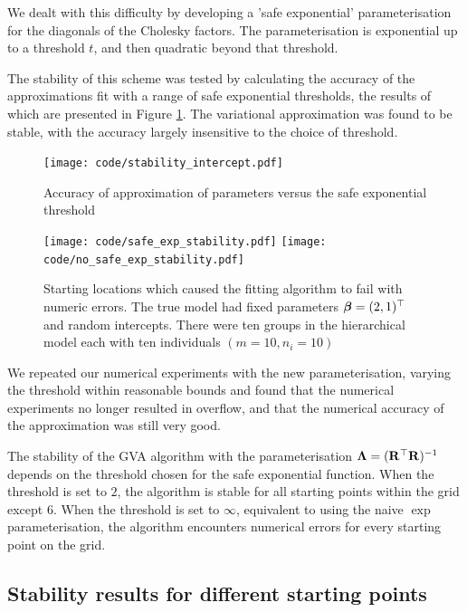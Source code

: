 \documentclass{amsart}[12pt]
\begin{document}
			We dealt with this difficulty by developing a 'safe exponential' parameterisation for the diagonals of the
			Cholesky factors. The parameterisation is exponential up to a threshold $t$, and then quadratic beyond that
			threshold.
			
			The stability of this scheme was tested by calculating the accuracy of the approximations fit with a range
			of safe exponential thresholds, the results of which are presented in Figure \ref{fig:stability_accuracy}.
			The variational approximation was found to be stable, with the accuracy largely insensitive to the choice of
			threshold.
			
			\begin{figure}
				\label{fig:stability_accuracy}
				\caption{Accuracy of approximation of parameters versus the safe exponential threshold}
				\texttt{[image: code/stability\_intercept.pdf]}
			\end{figure}
			
			\begin{figure}
				\label{fig:stability_locations}
				\caption{Starting locations which caused the fitting algorithm to fail with numeric errors. The true model 						had fixed parameters ${\boldsymbol \beta} = (2, 1)^\top$ and random intercepts. There were ten groups in the
					hierarchical model each	with ten individuals $(m=10, n_i=10)$}
				\texttt{[image: code/safe\_exp\_stability.pdf]}
				\texttt{[image: code/no\_safe\_exp\_stability.pdf]}
			\end{figure}
			
			We repeated our numerical experiments with the new parameterisation, varying the threshold within reasonable
			bounds and found that the numerical experiments no longer resulted in overflow, and that the numerical accuracy
			of the approximation was still very good.
			
			The stability of the GVA algorithm with the parameterisation ${\boldsymbol \Lambda} = ({\bf R}^\top {\bf R})^{-1}$ depends on the
			threshold chosen for the safe exponential function. When the threshold is set to $2$, the algorithm is stable
			for all starting points within the grid except $6$. When the threshold is set to $\infty$, equivalent to using
			the naive $\exp$ parameterisation, the algorithm encounters numerical errors for every starting point on the 
			grid.
				
			\subsection{Stability results for different starting points}
					
\end{document}
